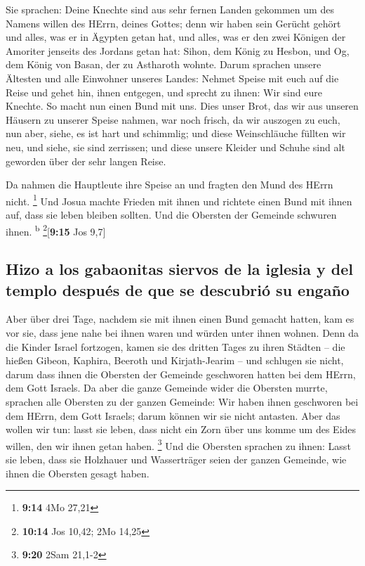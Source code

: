  Sie sprachen: Deine Knechte sind aus sehr fernen Landen
gekommen um des Namens willen des HErrn, deines Gottes; denn wir haben
sein Gerücht gehört und alles, was er in Ägypten getan hat,
 und alles, was er den zwei Königen der Amoriter jenseits
des Jordans getan hat: Sihon, dem König zu Hesbon, und Og, dem König von
Basan, der zu Astharoth wohnte.  Darum sprachen unsere
Ältesten und alle Einwohner unseres Landes: Nehmet Speise mit euch auf
die Reise und gehet hin, ihnen entgegen, und sprecht zu ihnen: Wir sind
eure Knechte. So macht nun einen Bund mit uns.  Dies
unser Brot, das wir aus unseren Häusern zu unserer Speise nahmen, war
noch frisch, da wir auszogen zu euch, nun aber, siehe, es ist hart und
schimmlig;  und diese Weinschläuche füllten wir neu, und
siehe, sie sind zerrissen; und diese unsere Kleider und Schuhe sind alt
geworden über der sehr langen Reise.

 Da nahmen die Hauptleute ihre Speise an und fragten den
Mund des HErrn nicht. \footnote{\textbf{9:14} 4Mo 27,21} 
Und Josua machte Frieden mit ihnen und richtete einen Bund mit ihnen
auf, dass sie leben bleiben sollten. Und die Obersten der Gemeinde
schwuren ihnen. \textsuperscript{b} \footnote{\textbf{10:14} Jos 10,42;
  2Mo 14,25}{[}\textbf{9:15} Jos 9,7{]}

\hypertarget{hizo-a-los-gabaonitas-siervos-de-la-iglesia-y-del-templo-despuuxe9s-de-que-se-descubriuxf3-su-engauxf1o}{%
\subsection{Hizo a los gabaonitas siervos de la iglesia y del templo
después de que se descubrió su
engaño}\label{hizo-a-los-gabaonitas-siervos-de-la-iglesia-y-del-templo-despuuxe9s-de-que-se-descubriuxf3-su-engauxf1o}}

 Aber über drei Tage, nachdem sie mit ihnen einen Bund
gemacht hatten, kam es vor sie, dass jene nahe bei ihnen waren und
würden unter ihnen wohnen.  Denn da die Kinder Israel
fortzogen, kamen sie des dritten Tages zu ihren Städten -- die hießen
Gibeon, Kaphira, Beeroth und Kirjath-Jearim --  und
schlugen sie nicht, darum dass ihnen die Obersten der Gemeinde
geschworen hatten bei dem HErrn, dem Gott Israels. Da aber die ganze
Gemeinde wider die Obersten murrte,  sprachen alle
Obersten zu der ganzen Gemeinde: Wir haben ihnen geschworen bei dem
HErrn, dem Gott Israels; darum können wir sie nicht antasten.
 Aber das wollen wir tun: lasst sie leben, dass nicht ein
Zorn über uns komme um des Eides willen, den wir ihnen getan haben.
\footnote{\textbf{9:20} 2Sam 21,1-2}  Und die Obersten
sprachen zu ihnen: Lasst sie leben, dass sie Holzhauer und Wasserträger
seien der ganzen Gemeinde, wie ihnen die Obersten gesagt haben.

